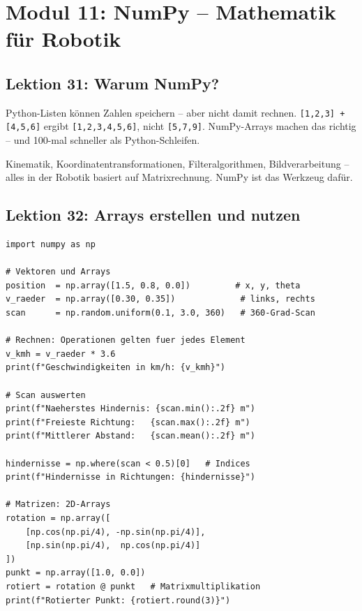 \chapter{Modul 11: NumPy -- Mathematik für Robotik}

\section{Lektion 31: Warum NumPy?}

\begin{analogie}
Python-Listen können Zahlen speichern -- aber nicht damit rechnen. \texttt{[1,2,3] + [4,5,6]} ergibt \texttt{[1,2,3,4,5,6]}, nicht \texttt{[5,7,9]}. NumPy-Arrays machen das richtig -- und 100-mal schneller als Python-Schleifen.
\end{analogie}

Kinematik, Koordinatentransformationen, Filteralgorithmen, Bildverarbeitung -- alles in der Robotik basiert auf Matrixrechnung. NumPy ist das Werkzeug dafür.

\section{Lektion 32: Arrays erstellen und nutzen}

\begin{lstlisting}
import numpy as np

# Vektoren und Arrays
position  = np.array([1.5, 0.8, 0.0])         # x, y, theta
v_raeder  = np.array([0.30, 0.35])             # links, rechts
scan      = np.random.uniform(0.1, 3.0, 360)   # 360-Grad-Scan

# Rechnen: Operationen gelten fuer jedes Element
v_kmh = v_raeder * 3.6
print(f"Geschwindigkeiten in km/h: {v_kmh}")

# Scan auswerten
print(f"Naeherstes Hindernis: {scan.min():.2f} m")
print(f"Freieste Richtung:   {scan.max():.2f} m")
print(f"Mittlerer Abstand:   {scan.mean():.2f} m")

hindernisse = np.where(scan < 0.5)[0]   # Indices
print(f"Hindernisse in Richtungen: {hindernisse}")

# Matrizen: 2D-Arrays
rotation = np.array([
    [np.cos(np.pi/4), -np.sin(np.pi/4)],
    [np.sin(np.pi/4),  np.cos(np.pi/4)]
])
punkt = np.array([1.0, 0.0])
rotiert = rotation @ punkt   # Matrixmultiplikation
print(f"Rotierter Punkt: {rotiert.round(3)}")
\end{lstlisting}

